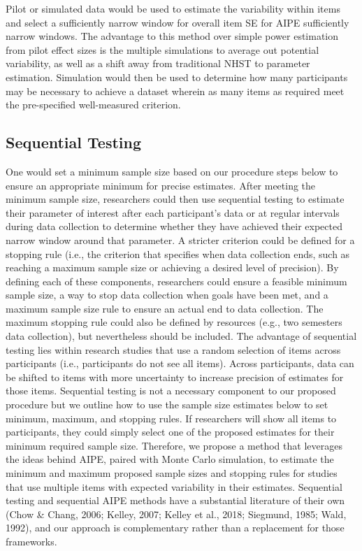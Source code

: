 \documentclass[
  man]{apa7}
\begin{document}
Pilot or simulated data would be used to estimate the variability within items and select a sufficiently narrow window for overall item SE for AIPE sufficiently narrow windows. The advantage to this method over simple power estimation from pilot effect sizes is the multiple simulations to average out potential variability, as well as a shift away from traditional NHST to parameter estimation. Simulation would then be used to determine how many participants may be necessary to achieve a dataset wherein as many items as required meet the pre-specified well-measured criterion.

\subsection{Sequential Testing}\label{sequential-testing}

One would set a minimum sample size based on our procedure steps below to ensure an appropriate minimum for precise estimates. After meeting the minimum sample size, researchers could then use sequential testing to estimate their parameter of interest after each participant's data or at regular intervals during data collection to determine whether they have achieved their expected narrow window around that parameter. A stricter criterion could be defined for a stopping rule (i.e., the criterion that specifies when data collection ends, such as reaching a maximum sample size or achieving a desired level of precision). By defining each of these components, researchers could ensure a feasible minimum sample size, a way to stop data collection when goals have been met, and a maximum sample size rule to ensure an actual end to data collection. The maximum stopping rule could also be defined by resources (e.g., two semesters data collection), but nevertheless should be included. The advantage of sequential testing lies within research studies that use a random selection of items across participants (i.e., participants do not see all items). Across participants, data can be shifted to items with more uncertainty to increase precision of estimates for those items. Sequential testing is not a necessary component to our proposed procedure but we outline how to use the sample size estimates below to set minimum, maximum, and stopping rules. If researchers will show all items to participants, they could simply select one of the proposed estimates for their minimum required sample size. Therefore, we propose a method that leverages the ideas behind AIPE, paired with Monte Carlo simulation, to estimate the minimum and maximum proposed sample sizes and stopping rules for studies that use multiple items with expected variability in their estimates. Sequential testing and sequential AIPE methods have a substantial literature of their own (Chow \& Chang, 2006; Kelley, 2007; Kelley et al., 2018; Siegmund, 1985; Wald, 1992), and our approach is complementary rather than a replacement for those frameworks.
\end{document}
